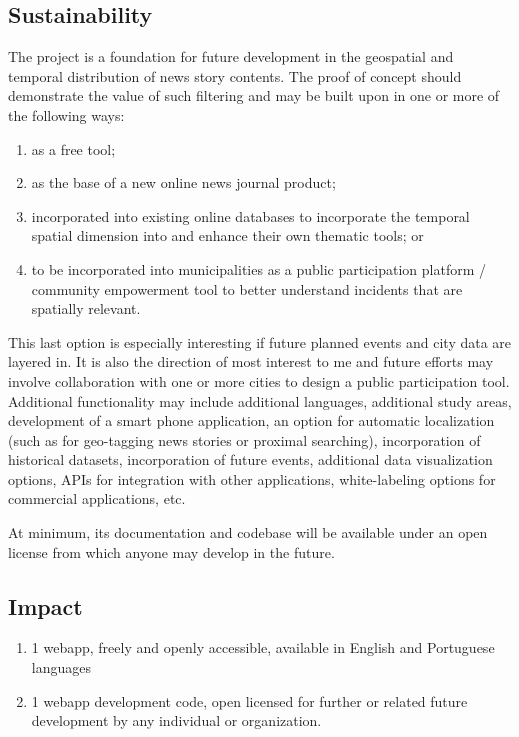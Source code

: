 \subsection{Sustainability}
The project is a foundation for future development in the geospatial and temporal distribution of news story contents.  The proof of concept should demonstrate the value of such filtering and may be built upon in one or more of the following ways: 
\begin{enumerate}
	\item as a free tool; 
	\item as the base of a new online news journal product;
	\item incorporated into existing online databases to incorporate the temporal spatial dimension into and enhance their own thematic tools; or 
	\item to be incorporated into municipalities as a public participation platform / community empowerment tool to better understand incidents that are spatially relevant. 
\end{enumerate}

This last option is especially interesting if future planned events and city data are layered in. It is also the direction of most interest to me and future efforts may involve collaboration with one or more cities to design a public participation tool. Additional functionality may include additional languages, additional study areas, development of a smart phone application, an option for automatic localization (such as for geo-tagging news stories or proximal searching), incorporation of historical datasets, incorporation of future events, additional data visualization options, APIs for integration with other applications, white-labeling options for commercial applications, etc.

At minimum, its documentation and codebase will be available under an open license from which anyone may develop in the future.

\subsection{Impact}
\begin{enumerate}
	\item 1 webapp, freely and openly accessible, available in English and Portuguese languages
	\item 1 webapp development code, open licensed for further or related future development by any individual or organization.
\end{enumerate}

